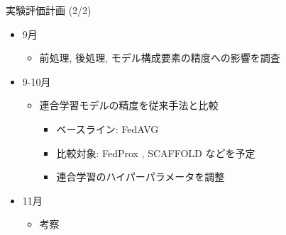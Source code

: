 \documentclass[unicode,12pt,aspectratio=169,dvipdfmx]{beamer}
\begin{document}
\begin{frame}{実験評価計画 (2/2)}
    \begin{itemize}
        \item 9月
        \begin{itemize}
            \item 前処理, 後処理, モデル構成要素の精度への影響を調査
        \end{itemize}
        \item 9-10月
        \begin{itemize}
            \item 連合学習モデルの精度を従来手法と比較
            \begin{itemize}
                \item ベースライン: FedAVG \cite{mcmahan2017communication}
                \item 比較対象: FedProx \cite{li2020federated}, SCAFFOLD \cite{karimireddy2020scaffold}などを予定
                \item 連合学習のハイパーパラメータを調整
            \end{itemize}
        \end{itemize}
        \item 11月
        \begin{itemize}
            \item 考察
        \end{itemize}
    \end{itemize}
\end{frame}

\end{document}
